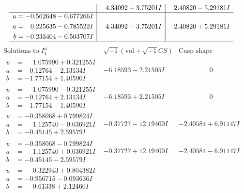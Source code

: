 \documentclass[1p]{elsarticle_modified}
\theoremstyle{definition}
\newcommand{\I}{\sqrt{-1}}
\begin{document}
$$\begin{array}{c|c|c}
 & \phantom{-}4.34092 + 3.75201 I & \phantom{-}2.40820 - 5.29181 I \\ \hline\begin{aligned}
u &= -0.562648 - 0.677266 I \\
a &= \phantom{-}0.225635 - 0.785522 I \\
b &= -0.233404 - 0.503707 I\end{aligned}
 & \phantom{-}4.34092 - 3.75201 I & \phantom{-}2.40820 + 5.29181 I\\
 \hline 
 \end{array}$$\newpage$$\begin{array}{c|c|c}  
\text{Solutions to }I^u_{1}& \I (\text{vol} + \sqrt{-1}CS) & \text{Cusp shape}\\
 \hline 
\begin{aligned}
u &= \phantom{-}1.075990 + 0.321255 I \\
a &= -0.12764 - 2.13134 I \\
b &= -1.77154 + 1.40590 I\end{aligned}
 & -6.18593 - 2.21505 I & \phantom{-0.000000 } 0 \\ \hline\begin{aligned}
u &= \phantom{-}1.075990 - 0.321255 I \\
a &= -0.12764 + 2.13134 I \\
b &= -1.77154 - 1.40590 I\end{aligned}
 & -6.18593 + 2.21505 I & \phantom{-0.000000 } 0 \\ \hline\begin{aligned}
u &= -0.358068 + 0.799824 I \\
a &= \phantom{-}1.125740 - 0.036921 I \\
b &= -0.45145 + 2.59579 I\end{aligned}
 & -0.37727 - 12.19400 I & -2.40584 + 6.91147 I \\ \hline\begin{aligned}
u &= -0.358068 - 0.799824 I \\
a &= \phantom{-}1.125740 + 0.036921 I \\
b &= -0.45145 - 2.59579 I\end{aligned}
 & -0.37727 + 12.19400 I & -2.40584 - 6.91147 I \\ \hline\begin{aligned}
u &= \phantom{-}0.322943 + 0.804382 I \\
a &= -0.956715 - 0.093636 I \\
b &= \phantom{-}0.61338 + 2.12460 I\end{aligned}

\end{array}$$
\end{document}
